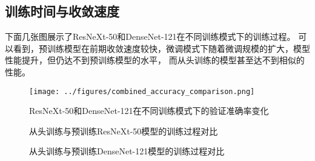 \documentclass[a4paper,10pt,twocolumn]{article}
\makeatletter
\renewcommand{\arraystretch}{1.2}  %
\let\@oldlabel\label
\renewcommand{\label}[1]{\@oldlabel{#1}}
\makeatother
\begin{document}
\subsection{训练时间与收敛速度}
下面几张图展示了ResNeXt-50和DenseNet-121在不同训练模式下的训练过程。
可以看到，预训练模型在前期收敛速度较快，微调模式下随着微调规模的扩大，模型性能提升，但仍达不到预训练模型的水平，
而从头训练的模型甚至达不到相似的性能。

\begin{figure}[H]
\centering
\texttt{[image: ../figures/combined\_accuracy\_comparison.png]}
\caption{ResNeXt-50和DenseNet-121在不同训练模式下的验证准确率变化}
\label{fig:accuracy_curve}
\end{figure}

\begin{figure}[H]
\centering
{}
\caption{从头训练与预训练ResNeXt-50模型的训练过程对比}
\label{fig:training_curves_resnext}
\end{figure}

\begin{figure}[H]
\centering
{}
\caption{从头训练与预训练DenseNet-121模型的训练过程对比}
\label{fig:training_curves_densenet}
\end{figure}

\begin{table}[H]
\centering
\caption{不同模型达到收敛所需的训练时间和epoch数量}
\renewcommand{\arraystretch}{1.2} %
\end{table}
\end{document}
